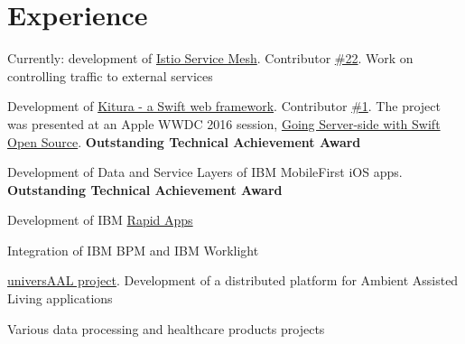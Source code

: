 \documentclass[]{deedy-resume}
\begin{document}
\hfill
\begin{minipage}[t]{0.66\textwidth}


\section{Experience}

\vspace{\topsep} %
\begin{tightemize}
\item Currently: development of \href{https://istio.io}{Istio Service Mesh}. Contributor \href{https://github.com/istio/istio/graphs/contributors}{\#22}. Work on controlling traffic to external services
\item Development of \href{https://github.com/IBM-Swift/Kitura}{Kitura - a Swift web framework}. Contributor \href{https://github.com/IBM-Swift/Kitura/graphs/contributors}{\#1}. The project was presented at an Apple WWDC 2016 session, \href{https://developer.apple.com/videos/play/wwdc2016/415/}{Going Server-side with Swift Open Source}. \textbf{Outstanding Technical Achievement Award}
\item Development of Data and Service Layers of IBM MobileFirst iOS apps.  \textbf{Outstanding Technical Achievement Award}
\item Development of IBM \href{https://www.youtube.com/watch?v=wKHfEx988mc}{Rapid Apps}
\item Integration of IBM BPM and IBM Worklight
\end{tightemize}
\sectionsep

\vspace{\topsep} %
\begin{tightemize}
\item \href{http://universaal.sintef9013.com/index.php/en/}{universAAL project}. Development of a distributed platform for Ambient Assisted Living applications
\item Various data processing and healthcare products projects
\end{tightemize}
\sectionsep


\end{minipage}
\end{document}
